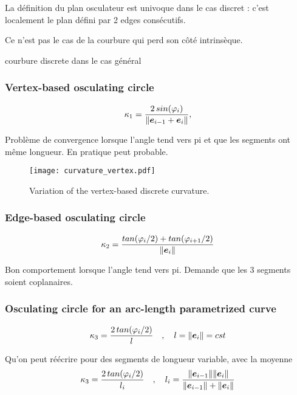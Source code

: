 La définition du plan osculateur est univoque dans le cas discret : c'est localement le plan défini par 2 edges consécutifs.

Ce n'est pas le cas de la courbure qui perd son côté intrinsèque.

courbure discrete dans le cas général

\subsubsection{Vertex-based osculating circle}

\begin{equation}
	\kappa_1 = \frac{2 \,sin(\varphi_i)}{\|\boldsymbol{e}_{i-1} + \boldsymbol{e}_{i} \|},
\end{equation}

Problème de convergence lorsque l'angle tend vers pi et que les segments ont même longueur.
En pratique peut probable.

\begin{figure}[]
\begin{center}
\texttt{[image: curvature\_vertex.pdf]}
\caption{Variation of the vertex-based discrete curvature.}
\label{fig:3_7}
\end{center}
\end{figure}

\subsubsection{Edge-based osculating circle}

\begin{equation}
	\kappa_2 = \frac{tan(\varphi_i/2) + tan(\varphi_{i+1}/2)}{\|\boldsymbol{e}_{i}\|}
\end{equation}

Bon comportement lorsque l'angle tend vers pi. Demande que les 3 segments soient coplanaires.

\subsubsection{Osculating circle for an arc-length parametrized curve}
\begin{equation}
	\kappa_3 = \frac{2 \,tan(\varphi_i/2)}{l}
	\quad , \quad 
	l = \|\boldsymbol{e}_{i} \| = cst
\end{equation}

Qu'on peut réécrire pour des segments de longueur variable, avec la moyenne
\begin{equation}
	\kappa_3 = \frac{2 \,tan(\varphi_i/2)}{l_i}
	\quad , \quad 
	l_i = \frac{\|\boldsymbol{e}_{i-1} \| \|\boldsymbol{e}_{i} \|}{\|\boldsymbol{e}_{i-1}\| + \|\boldsymbol{e}_{i}\|}
\end{equation}

